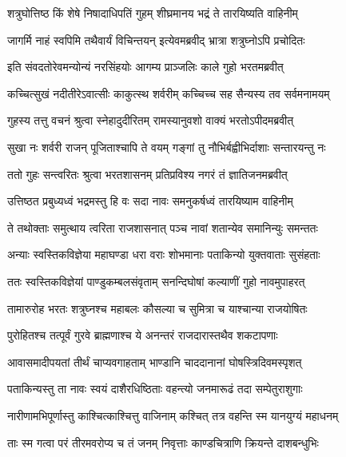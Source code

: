 \twolineshloka
{शत्रुघोत्तिष्ठ किं शेषे निषादाधिपतिं गुहम्}
{शीघ्रमानय भद्रं ते तारयिष्यति वाहिनीम्} %

\twolineshloka
{जागर्मि नाहं स्वपिमि तथैवार्यं विचिन्तयन्}
{इत्येवमब्रवीद् भ्रात्रा शत्रुघ्नोऽपि प्रचोदितः} %

\twolineshloka
{इति संवदतोरेवमन्योन्यं नरसिंहयोः}
{आगम्य प्राञ्जलिः काले गुहो भरतमब्रवीत्} %

\twolineshloka
{कच्चित्सुखं नदीतीरेऽवात्सीः काकुत्स्थ शर्वरीम्}
{कच्चिच्च सह सैन्यस्य तव सर्वमनामयम्} %

\twolineshloka
{गुहस्य तत्तु वचनं श्रुत्वा स्नेहादुदीरितम्}
{रामस्यानुवशो वाक्यं भरतोऽपीदमब्रवीत्} %

\twolineshloka
{सुखा नः शर्वरी राजन् पूजिताश्चापि ते वयम्}
{गङ्गां तु नौभिर्बह्वीभिर्दाशाः सन्तारयन्तु नः} %

\twolineshloka
{ततो गुहः सन्त्वरितः श्रुत्वा भरतशासनम्}
{प्रतिप्रविश्य नगरं तं ज्ञातिजनमब्रवीत्} %

\twolineshloka
{उत्तिष्ठत प्रबुध्यध्वं भद्रमस्तु हि वः सदा}
{नावः समनुकर्षध्वं तारयिष्याम वाहिनीम्} %

\twolineshloka
{ते तथोक्ताः समुत्थाय त्वरिता राजशासनात्}
{पञ्च नावां शतान्येव समानिन्युः समन्ततः} %

\twolineshloka
{अन्याः स्वस्तिकविज्ञेया महाघण्डा धरा वराः}
{शोभमानाः पताकिन्यो युक्तवाताः सुसंहताः} %

\twolineshloka
{ततः स्वस्तिकविज्ञेयां पाण्डुकम्बलसंवृताम्}
{सनन्दिघोषां कल्याणीं गुहो नावमुपाहरत्} %

\twolineshloka
{तामारुरोह भरतः शत्रुघ्नश्च महाबलः}
{कौसल्या च सुमित्रा च याश्चान्या राजयोषितः} %

\twolineshloka
{पुरोहितश्च तत्पूर्वं गुरवे ब्राह्मणाश्च ये}
{अनन्तरं राजदारास्तथैव शकटापणाः} %

\twolineshloka
{आवासमादीपयतां तीर्थं चाप्यवगाहताम्}
{भाण्डानि चाददानानां घोषस्त्रिदिवमस्पृशत्} %

\twolineshloka
{पताकिन्यस्तु ता नावः स्वयं दाशैरधिष्ठिताः}
{वहन्त्यो जनमारूढं तदा सम्पेतुराशुगाः} %

\twolineshloka
{नारीणामभिपूर्णास्तु काश्चित्काश्चित्तु वाजिनाम्}
{कश्चित् तत्र वहन्ति स्म यानयुग्यं महाधनम्} %

\twolineshloka
{ताः स्म गत्वा परं तीरमवरोप्य च तं जनम्}
{निवृत्ताः काण्डचित्राणि क्रियन्ते दाशबन्धुभिः} %

